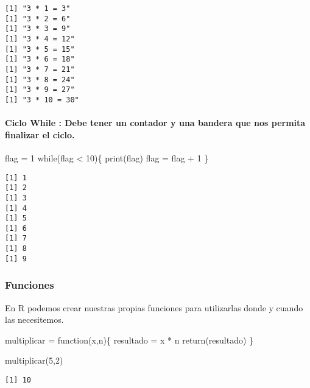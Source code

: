 \documentclass[
  letterpaper,
  DIV=11,
  numbers=noendperiod]{scrartcl}
\let\oldparagraph\paragraph
\renewcommand{\paragraph}[1]{\oldparagraph{#1}\mbox{}}
\newenvironment{Shaded}{\begin{snugshade}}{\end{snugshade}}
\newcommand{\ControlFlowTok}[1]{\textcolor[rgb]{0.00,0.23,0.31}{#1}}
\newcommand{\DecValTok}[1]{\textcolor[rgb]{0.68,0.00,0.00}{#1}}
\newcommand{\FunctionTok}[1]{\textcolor[rgb]{0.28,0.35,0.67}{#1}}
\newcommand{\NormalTok}[1]{\textcolor[rgb]{0.00,0.23,0.31}{#1}}
\newcommand{\OtherTok}[1]{\textcolor[rgb]{0.00,0.23,0.31}{#1}}
\newcommand{\SpecialCharTok}[1]{\textcolor[rgb]{0.37,0.37,0.37}{#1}}
\begin{document}
\begin{verbatim}
[1] "3 * 1 = 3"
[1] "3 * 2 = 6"
[1] "3 * 3 = 9"
[1] "3 * 4 = 12"
[1] "3 * 5 = 15"
[1] "3 * 6 = 18"
[1] "3 * 7 = 21"
[1] "3 * 8 = 24"
[1] "3 * 9 = 27"
[1] "3 * 10 = 30"
\end{verbatim}

\paragraph{Ciclo While : Debe tener un contador y una bandera que nos
permita finalizar el
ciclo.}\label{ciclo-while-debe-tener-un-contador-y-una-bandera-que-nos-permita-finalizar-el-ciclo.}

\begin{Shaded}
\begin{Highlighting}[]
\NormalTok{flag }\OtherTok{=} \DecValTok{1}
\ControlFlowTok{while}\NormalTok{(flag }\SpecialCharTok{\textless{}} \DecValTok{10}\NormalTok{)\{}
  \FunctionTok{print}\NormalTok{(flag)}
\NormalTok{  flag }\OtherTok{=}\NormalTok{ flag }\SpecialCharTok{+} \DecValTok{1}
\NormalTok{\}}
\end{Highlighting}
\end{Shaded}

\begin{verbatim}
[1] 1
[1] 2
[1] 3
[1] 4
[1] 5
[1] 6
[1] 7
[1] 8
[1] 9
\end{verbatim}

\subsubsection{Funciones}\label{funciones}

En R podemos crear nuestras propias funciones para utilizarlas donde y
cuando las necesitemos.

\begin{Shaded}
\begin{Highlighting}[]
\NormalTok{multiplicar }\OtherTok{=} \ControlFlowTok{function}\NormalTok{(x,n)\{}
\NormalTok{  resultado }\OtherTok{=}\NormalTok{ x }\SpecialCharTok{*}\NormalTok{ n}
  \FunctionTok{return}\NormalTok{(resultado)}
\NormalTok{\}}

\FunctionTok{multiplicar}\NormalTok{(}\DecValTok{5}\NormalTok{,}\DecValTok{2}\NormalTok{)}
\end{Highlighting}
\end{Shaded}

\begin{verbatim}
[1] 10
\end{verbatim}
\end{document}
